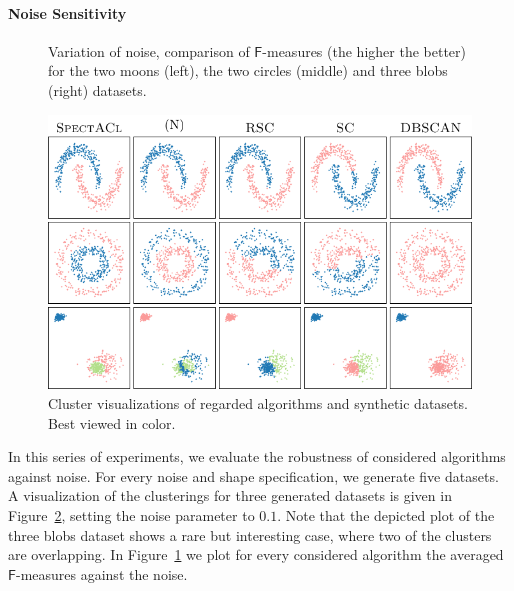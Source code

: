 \paragraph{Noise Sensitivity}
\begin{figure}[t]
\centering

\caption{Variation of noise, comparison of $\mathsf{F}$-measures (the higher the better) for the two moons (left), the two circles (middle) and three blobs (right) datasets.}
\label{fig:noisePlot}
\end{figure}
\begin{figure}[t]
\centering
\includegraphics[width=\linewidth]{pics/SASynthScatter.pdf}
%
\caption{Cluster visualizations of regarded algorithms and synthetic datasets. Best viewed in color.}
\label{fig:synthViz}
\end{figure}
In this series of experiments, we evaluate the robustness of considered algorithms against noise. For every noise and shape specification, we generate five datasets. A visualization of the clusterings for three generated datasets is given in Figure~\ref{fig:synthViz}, setting the noise parameter to $0.1$. Note that the depicted plot of the three blobs dataset shows a rare but interesting case, where two of the clusters are overlapping. In Figure~\ref{fig:noisePlot} we plot for every considered algorithm the averaged $\mathsf{F}$-measures against the noise.  

